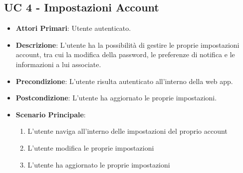 	\subsection{UC 4 - Impostazioni Account}
		
		
		\begin{itemize}
			\item \textbf{Attori Primari}: Utente autenticato.
			\item \textbf{Descrizione}: L'utente ha la possibilità di gestire le proprie impostazioni account, tra cui la modifica della password, le preferenze di notifica e le informazioni a lui associate.
			\item \textbf{Precondizione}: L'utente risulta autenticato all'interno della web app.
			\item \textbf{Postcondizione}: L'utente ha aggiornato le proprie impostazioni.
			\item \textbf{Scenario Principale}:
			\begin{enumerate}
				\item{L'utente naviga all'interno delle impostazioni del proprio account}
				\item{L'utente modifica le proprie impostazioni}
				\item{L'utente ha aggiornato le proprie impostazioni}
			\end{enumerate}	
		\end{itemize}
			

